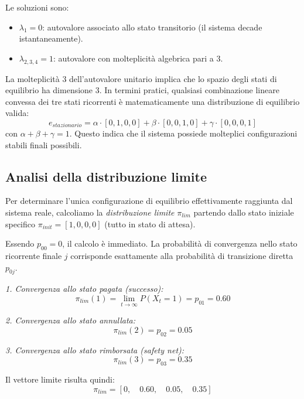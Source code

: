 Le soluzioni sono:
\begin{itemize}
    \item $\lambda_1 = 0$: autovalore associato allo stato transitorio (il sistema decade istantaneamente).
    \item $\lambda_{2,3,4} = 1$: autovalore con molteplicità algebrica pari a 3.
\end{itemize}

La molteplicità 3 dell'autovalore unitario implica che lo spazio degli stati di equilibrio ha dimensione 3. In termini pratici, qualsiasi combinazione lineare convessa dei tre stati ricorrenti è matematicamente una distribuzione di equilibrio valida:
\[ e_{stazionario} = \alpha \cdot [0,1,0,0] + \beta \cdot [0,0,1,0] + \gamma \cdot [0,0,0,1] \]
con $\alpha + \beta + \gamma = 1$.
Questo indica che il sistema possiede molteplici configurazioni stabili finali possibili.

\subsection{Analisi della distribuzione limite}
Per determinare l'unica configurazione di equilibrio effettivamente raggiunta dal sistema reale, calcoliamo la \textit{distribuzione limite} $\pi_{lim}$ partendo dallo stato iniziale specifico $\pi_{init} = [1, 0, 0, 0]$ (tutto in stato di attesa).

Essendo $p_{00}=0$, il calcolo è immediato. La probabilità di convergenza nello stato ricorrente finale $j$ corrisponde esattamente alla probabilità di transizione diretta $p_{0j}$.

\textit{1. Convergenza allo stato pagata (successo):}
\begin{equation}
\pi_{lim}(1) = \lim_{t \to \infty} P(X_t = 1) = p_{01} = 0.60
\end{equation}

\textit{2. Convergenza allo stato annullata:}
\begin{equation}
\pi_{lim}(2) = p_{02} = 0.05
\end{equation}

\textit{3. Convergenza allo stato rimborsata (safety net):}
\begin{equation}
\pi_{lim}(3) = p_{03} = 0.35
\end{equation}

Il vettore limite risulta quindi:
\begin{equation}
\pi_{lim} = [0, \quad 0.60, \quad 0.05, \quad 0.35]
\end{equation}


